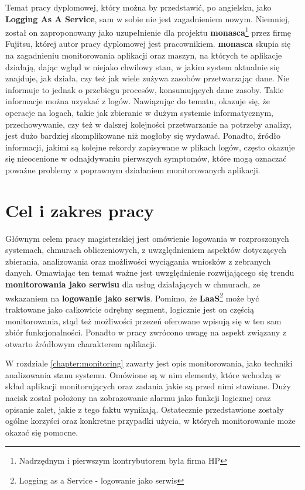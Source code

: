 Temat pracy dyplomowej, który można by przedstawić, po angielsku, jako \textbf{Logging As A Service}, sam w sobie nie jest zagadnieniem
nowym. Niemniej, został on zaproponowany jako uzupełnienie dla projektu \textbf{monasca}\footnote{Nadrzędnym i pierwszym kontrybutorem była firma HP} przez
firmę Fujitsu, której autor pracy dyplomowej jest pracownikiem. 
\textbf{monasca} skupia się na zagadnieniu monitorowania aplikacji oraz maszyn, na których te aplikacje działają, dając wgląd w niejako
chwilowy stan, w jakim system aktualnie się znajduje, jak działa, czy też jak wiele zużywa zasobów przetwarzając dane. Nie informuje to jednak o 
przebiegu procesów, konsumujących dane zasoby. Takie informacje można uzyskać z logów. Nawiązując do tematu, okazuje się, że operacje na logach, takie jak 
zbieranie w dużym systemie informatycznym, przechowywanie, czy też w dalszej kolejności przetwarzanie na potrzeby analizy, jest dużo bardziej 
skomplikowane niż mogłoby się wydawać. Ponadto, źródło informacji, jakimi są kolejne rekordy zapisywane w plikach logów, często okazuje się nieocenione w 
odnajdywaniu pierwszych symptomów, które mogą oznaczać poważne problemy z poprawnym działaniem monitorowanych aplikacji.

\section{Cel i zakres pracy}

Głównym celem pracy magisterskiej jest omówienie logowania w rozproszonych systemach, chmurach obliczeniowych, 
z uwzględnieniem aspektów dotyczących zbierania, analizowania oraz możliwości wyciągania wniosków z zebranych danych.
Omawiając ten temat ważne jest uwzględnienie rozwijającego się trendu \textbf{monitorowania jako serwisu} dla usług 
działających w chmurach, ze wskazaniem na \textbf{logowanie jako serwis}. Pomimo, że \textbf{LaaS}\footnote{Logging as a 
Service - logowanie jako serwis} może być traktowane jako całkowicie odrębny segment, logicznie jest on częścią 
monitorowania, stąd też możliwości przezeń oferowane wpisują się w ten sam zbiór funkcjonalności. 
Ponadto w pracy zwrócono uwagę na aspekt związany z otwarto źródłowym charakterem aplikacji.

W rozdziale \ref{chapter:monitoring} zawarty jest opis monitorowania, jako techniki
analizowania stanu systemu. Omówione są w nim elementy, które wchodzą w skład aplikacji
monitorujących oraz zadania jakie są przed nimi stawiane. Duży nacisk został położony
na zobrazowanie alarmu jako funkcji logicznej oraz opisanie zalet, jakie z tego faktu
wynikają. Ostatecznie przedstawione zostały ogólne korzyści oraz konkretne przypadki użycia,
w których monitorowanie może okazać się pomocne.

